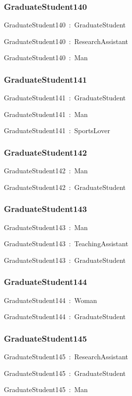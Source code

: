 \documentclass{article}
\begin{document}
\subsubsection*{GraduateStudent140}

GraduateStudent140~:~GraduateStudent

GraduateStudent140~:~ResearchAssistant

GraduateStudent140~:~Man

\subsubsection*{GraduateStudent141}

GraduateStudent141~:~GraduateStudent

GraduateStudent141~:~Man

GraduateStudent141~:~SportsLover

\subsubsection*{GraduateStudent142}

GraduateStudent142~:~Man

GraduateStudent142~:~GraduateStudent

\subsubsection*{GraduateStudent143}

GraduateStudent143~:~Man

GraduateStudent143~:~TeachingAssistant

GraduateStudent143~:~GraduateStudent

\subsubsection*{GraduateStudent144}

GraduateStudent144~:~Woman

GraduateStudent144~:~GraduateStudent

\subsubsection*{GraduateStudent145}

GraduateStudent145~:~ResearchAssistant

GraduateStudent145~:~GraduateStudent

GraduateStudent145~:~Man
\end{document}
